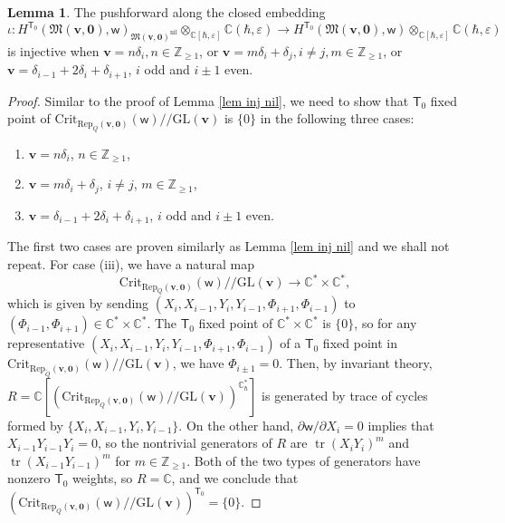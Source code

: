\documentclass[10pt]{amsart}
\theoremstyle{definition}
\newtheorem{Lemma}[Theorem]{Lemma}
\numberwithin{equation}{section}
\newcommand{\GL}{\mathrm{GL}}
\newcommand{\Crit}{\mathrm{Crit}}
\newcommand{\bC}{\mathbb{C}}
\newcommand{\bZ}{\mathbb{Z}}
\newcommand{\bv}{\mathbf{v}}
\newcommand{\fM}{\mathfrak{M}}
\newcommand{\sT}{\mathsf{T}}
\newcommand{\sw}{\mathsf{w}}
\newcommand{\tr}{\operatorname{tr}}
\begin{document}
\begin{Lemma}\label{lem inj nil super}
The pushforward along the closed embedding $$\iota\colon H^{\sT_0}(\fM(\bv,\mathbf 0),\sw)_{\fM(\bv,\mathbf 0)^{\mathrm{nil}}}\otimes_{\bC[\hbar,\varepsilon]}\bC(\hbar,\varepsilon)\to H^{\sT_0}(\fM(\bv,\mathbf 0),\sw)\otimes_{\bC[\hbar,\varepsilon]}\bC(\hbar,\varepsilon)$$ is injective when $\bv=n\delta_i,n\in \bZ_{\geqslant 1}$, or $\bv=m\delta_i+\delta_j,i\neq j,m\in \bZ_{\geqslant 1}$, or $\bv=\delta_{i-1}+2\delta_i+\delta_{i+1}$, $i$ odd and $i\pm 1$ even.
\end{Lemma}

\begin{proof}
Similar to the proof of Lemma \ref{lem inj nil}, we need to show that $\sT_0$ fixed point of $\Crit_{\mathrm{Rep}_{Q}(\bv,\mathbf 0)}(\sw)/\!\!/\GL(\bv)$ is $\{0\}$ in the following three cases:
\begin{enumerate}
    \item[(i)] $\bv=n\delta_i$, $n\in \bZ_{\geqslant 1}$,
    \item[(ii)] $\bv=m\delta_i+\delta_j$, $i\neq j$, $m\in \bZ_{\geqslant 1}$,
    \item[(iii)]  $\bv=\delta_{i-1}+2\delta_i+\delta_{i+1}$, $i$ odd and $i\pm 1$ even.
\end{enumerate}
The first two cases are proven similarly as Lemma \ref{lem inj nil} and we shall not repeat. For case (iii), we have a natural map $$\Crit_{\mathrm{Rep}_{Q}(\bv,\mathbf 0)}(\sw)/\!\!/\GL(\bv)\to \bC^*\times \bC^*,$$
which is given by sending $(X_i,X_{i-1},Y_i,Y_{i-1},\Phi_{i+1},\Phi_{i-1})$ to $(\Phi_{i-1},\Phi_{i+1})\in \bC^*\times \bC^*$. The $\sT_0$ fixed point of $\bC^*\times \bC^*$ is $\{0\}$, so for any representative $(X_i,X_{i-1},Y_i,Y_{i-1},\Phi_{i+1},\Phi_{i-1})$ of a $\sT_0$ fixed point in $\Crit_{\mathrm{Rep}_{\widetilde{Q}}(\bv,\mathbf 0)}(\sw)/\!\!/\GL(\bv)$, we have $\Phi_{i\pm 1}=0$. Then, by invariant theory, $R=\bC\left[\left(\Crit_{\mathrm{Rep}_{Q}(\bv,\mathbf 0)}(\sw)/\!\!/\GL(\bv)\right)^{\bC^*_\hbar}\right]$ is generated by trace of cycles formed by $\{X_i,X_{i-1},Y_i,Y_{i-1}\}$. On the other hand, $\partial\sw/\partial X_i=0$ implies that $X_{i-1}Y_{i-1}Y_i=0$, so the nontrivial generators of $R$ are $\tr(X_iY_i)^m$ and $\tr(X_{i-1}Y_{i-1})^m$ for $m\in \bZ_{\geqslant 1}$. Both of the two types of generators have nonzero $\sT_0$ weights, so $R=\bC$, and we conclude that $\left(\Crit_{\mathrm{Rep}_{Q}(\bv,\mathbf 0)}(\sw)/\!\!/\GL(\bv)\right)^{\sT_0}=\{0\}$.
\end{proof}
\end{document}
